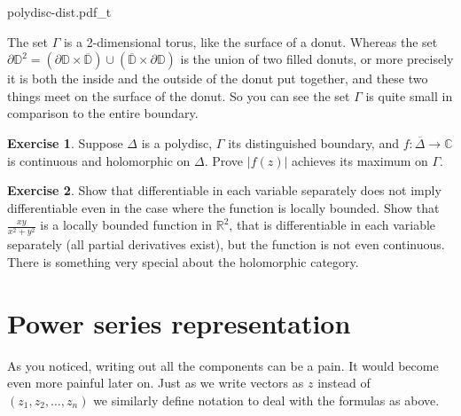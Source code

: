 \documentclass[12pt,openany]{book}
\newcommand{\sabs}[1]{\lvert {#1} \rvert}
\newcommand{\C}{{\mathbb{C}}}
\newcommand{\R}{{\mathbb{R}}}
\newcommand{\D}{{\mathbb{D}}}
\theoremstyle{plain}
\theoremstyle{remark}
\theoremstyle{definition}
\newenvironment{exbox}{%
    \def\FrameCommand{\vrule width 1pt \relax\hspace {10pt}}%
    \MakeFramed {\advance \hsize -\width \FrameRestore }%
}{%
    \endMakeFramed
}
\theoremstyle{exercise}
\newtheorem{exercise}{Exercise}[section]
\theoremstyle{example}
\begin{document}

\begin{center}
{polydisc-dist.pdf_t}
\end{center}


The set $\Gamma$ is a 2-dimensional torus, like the surface of a
donut.  Whereas the set $\partial \D^2 =
(\partial \D \times \overline{\D}) \cup
(\overline{\D} \times \partial \D)$ is the union of two filled donuts, or more
precisely it is both the inside and the outside of the donut put together,
and these two things meet on the surface of the donut.  So you can see the
set $\Gamma$ is quite small in comparison to the entire boundary.

\begin{exbox}
\begin{exercise}
Suppose $\Delta$ is a polydisc, $\Gamma$ its distinguished boundary,
and $f \colon \overline{\Delta} \to \C$ is continuous and 
holomorphic on $\Delta$.
Prove
$\sabs{f(z)}$ achieves its maximum on $\Gamma$.
\end{exercise}

\begin{exercise}
Show that differentiable
in each variable separately does not imply differentiable even in
the case where the function is locally bounded.
Show that $\frac{xy}{x^2+y^2}$ is a
locally bounded function in $\R^2$, that is differentiable
in each variable separately (all partial derivatives exist), but 
the function is not even continuous.  There is something very
special about the holomorphic category.
\end{exercise}
\end{exbox}


\section{Power series representation}

As you noticed, writing out all the components can be a pain.  It would become
even more painful later on.  Just as we write 
vectors as $z$ instead of $(z_1,z_2,\ldots,z_n)$ we similarly
define notation to deal with the formulas as above.
\end{document}
